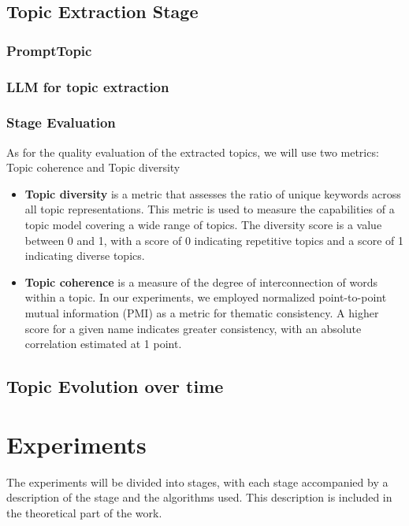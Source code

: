 \documentclass[PMI,VKR]{HSEUniversity}
\begin{document}
\section{Topic Extraction Stage}


\subsection{PromptTopic}


\subsection{LLM for topic extraction}

\subsection{Stage Evaluation}
As for the quality evaluation of the extracted topics, we will use two metrics: Topic coherence and Topic diversity
\begin{itemize}
    \item \textbf{Topic diversity} is a metric that assesses the ratio of unique keywords across all topic representations. This metric is used to measure the capabilities of a topic model covering a wide range of topics. The diversity score is a value between 0 and 1, with a score of 0 indicating repetitive topics and a score of 1 indicating diverse topics.
    \item \textbf{Topic coherence} is a measure of the degree of interconnection of words within a topic. In our experiments, we employed normalized point-to-point mutual information (PMI) as a metric for thematic consistency. A higher score for a given name indicates greater consistency, with an absolute correlation estimated at 1 point.
    \end{itemize}


\section{Topic Evolution over time}






\newpage
\chapter{Experiments}

The experiments will be divided into stages, with each stage accompanied by a description of the stage and the algorithms used. 
This description is included in the theoretical part of the work.
\end{document}
